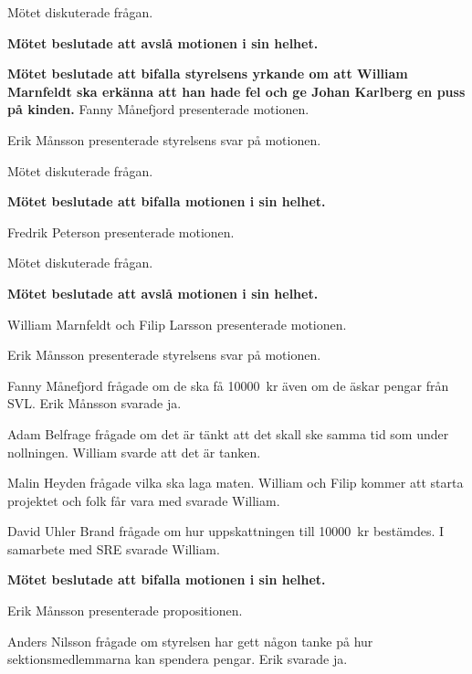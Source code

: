 \documentclass[10pt]{article}
\begin{document}
\begin{paragrafer}
\begin{paragrafer}
        Mötet diskuterade frågan.

        \textbf{Mötet beslutade att avslå motionen i sin helhet.}

        \textbf{Mötet beslutade att bifalla styrelsens yrkande om att William Marnfeldt ska erkänna att han hade fel och ge Johan Karlberg en puss på kinden.}
        Fanny Månefjord presenterade motionen.

        Erik Månsson presenterade styrelsens svar på motionen.

        Mötet diskuterade frågan.

        \textbf{Mötet beslutade att bifalla motionen i sin helhet.}

        Fredrik Peterson presenterade motionen.

        Mötet diskuterade frågan.

        \textbf{Mötet beslutade att avslå motionen i sin helhet.}

        William Marnfeldt och Filip Larsson presenterade motionen.

        Erik Månsson presenterade styrelsens svar på motionen.

        Fanny Månefjord frågade om de ska få \SI{10000}{kr} även om de äskar pengar från SVL. Erik Månsson svarade ja.

        Adam Belfrage frågade om det är tänkt att det skall ske samma tid som under nollningen. William svarde att det är tanken.

        Malin Heyden frågade vilka ska laga maten.  William och Filip kommer att starta projektet och folk får vara med svarade William.

        David Uhler Brand frågade om hur uppskattningen till \SI{10000}{kr} bestämdes. I samarbete med SRE svarade William.

        \textbf{Mötet beslutade att bifalla motionen i sin helhet.}

    \end{paragrafer}
    \begin{paragrafer}
        Erik Månsson presenterade propositionen.

        Anders Nilsson frågade om styrelsen har gett någon tanke på hur sektionsmedlemmarna kan spendera pengar. Erik svarade ja.


\end{paragrafer}
\end{paragrafer}
\end{document}
